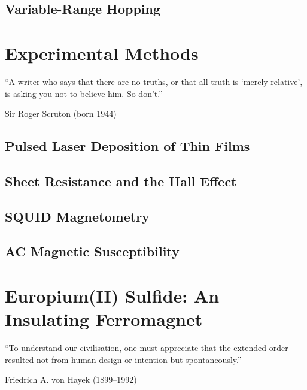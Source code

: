 ﻿\documentclass{report}
\begin{document}
    \section{Variable-Range Hopping}\label{sec:vrh}
        


\chapter{Experimental Methods}\label{ch:methods}%
\epigraph{``A writer who says that there are no truths, or that all truth is `merely relative', is asking you not to believe him. So don't.''}{Sir Roger Scruton (born 1944)}
    \section{Pulsed Laser Deposition of Thin Films}\label{sec:pld}
		
    \section{Sheet Resistance and the Hall Effect}\label{sec:vdp}
		
    \section{SQUID Magnetometry}\label{sec:squid}
        
    \section{AC Magnetic Susceptibility}\label{sec:acm}
        


\chapter{Europium(II) Sulfide: An Insulating Ferromagnet}\label{ch:EuS}
\epigraph{``To understand our civilisation, one must appreciate that the extended order resulted not from human design or intention but spontaneously.''}{Friedrich A. von Hayek (1899--1992)}~\\
    
\end{document}
